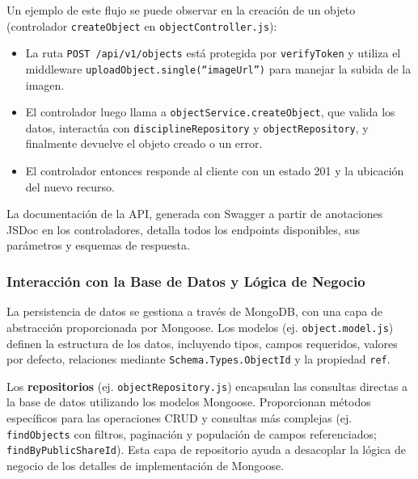 Un ejemplo de este flujo se puede observar en la creación de un objeto (controlador \texttt{createObject} en \texttt{objectController.js}): 
\begin{itemize}
    \item La ruta \texttt{POST /api/v1/objects} está protegida por \texttt{verifyToken} y utiliza el middleware \texttt{uploadObject.single(``imageUrl'')} para manejar la subida de la imagen.
    \item El controlador luego llama a \texttt{objectService.createObject}, que valida los datos, interactúa con \texttt{disciplineRepository} y \texttt{objectRepository}, y finalmente devuelve el objeto creado o un error.
    \item El controlador entonces responde al cliente con un estado 201 y la ubicación del nuevo recurso.
     
\end{itemize}   
La documentación de la API, generada con Swagger a partir de anotaciones JSDoc en los controladores, detalla todos los endpoints disponibles, sus parámetros y esquemas de respuesta.

\subsubsection{Interacción con la Base de Datos y Lógica de Negocio}
\label{sssec:backendDbLogica}

La persistencia de datos se gestiona a través de MongoDB, con una capa de abstracción proporcionada por Mongoose. Los modelos (ej. \texttt{object.model.js}) definen la estructura de los datos, incluyendo tipos, campos requeridos, valores por defecto, relaciones mediante \texttt{Schema.Types.ObjectId} y la propiedad \texttt{ref}.

Los \textbf{repositorios} (ej. \texttt{objectRepository.js}) encapsulan las consultas directas a la base de datos utilizando los modelos Mongoose. Proporcionan métodos específicos para las operaciones CRUD y consultas más complejas (ej. \texttt{findObjects} con filtros, paginación y populación de campos referenciados; \texttt{findByPublicShareId}). Esta capa de repositorio ayuda a desacoplar la lógica de negocio de los detalles de implementación de Mongoose.

